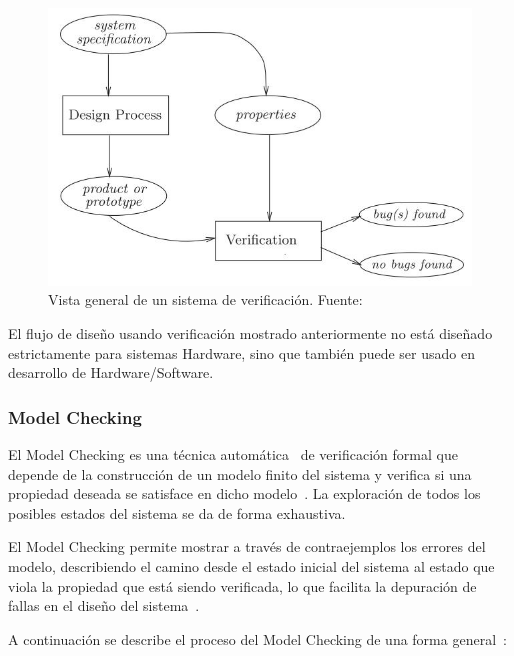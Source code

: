 \begin{figure}[!h]
  \centering
  \includegraphics[scale=0.6]{./images/vistaSistemaVerificacion.jpg}
  \caption{Vista general de un sistema de 
verificaci\'on. Fuente:~\cite[p.~3]{Baier2008}}
  \label{fig:sisVerificacion}
\end{figure}

El flujo de dise\~no usando verificaci\'on mostrado anteriormente no est\'a dise\~nado estrictamente para sistemas Hardware, sino que tambi\'en puede ser usado en desarrollo de Hardware/Software.


\subsubsection{Model Checking}

El Model Checking es una t\'ecnica autom\'atica~\cite{Vaovic2005} de 
verificaci\'on formal que depende de la construcci\'on de un modelo finito del 
sistema y verifica si una propiedad deseada se satisface en dicho 
modelo~\cite{Clarke1996}. La exploraci\'on de todos los posibles estados del 
sistema 
se da de forma exhaustiva.

El Model Checking permite mostrar a trav\'es de contraejemplos los errores del 
modelo, describiendo el camino desde el estado inicial del sistema al estado que 
viola la propiedad que est\'a siendo verificada, lo que facilita la depuraci\'on 
de fallas en el dise\~no del sistema~\cite{Baier2008,Vaovic2005}.

A continuaci\'on se describe el proceso del Model Checking de una forma 
general~\cite{Baier2008}:

